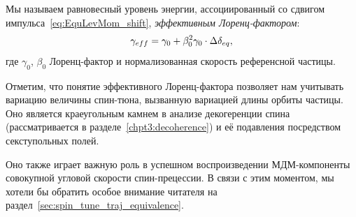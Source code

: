 Мы называем равновесный уровень энергии, ассоциированный со сдвигом импульса~\eqref{eq:EquLevMom_shift},
\emph{эффективным Лоренц-фактором}:
\begin{equation}\label{eq:EffectiveGamma}
\g*= \gamma_0 + \beta_0^2\gamma_0\cdot\Delta\delta_{eq},
\end{equation}
где $\gamma_0$, $\beta_0$ Лоренц-фактор и нормализованная скорость референсной частицы.

Отметим, что понятие эффективного Лоренц-фактора позволяет нам учитывать вариацию величины спин-тюна,
вызванную вариацией длины орбиты частицы. Оно является краеугольным камнем в анализе 
декогеренции спина (рассматривается в разделе~\ref{chpt3:decoherence}) и её подавления посредством секступольных полей.

Оно также играет важную роль в успешном воспроизведении МДМ-компоненты совокупной угловой скорости
спин-прецессии. В связи с этим моментом, мы хотели бы обратить особое внимание читателя на раздел~\ref{sec:spin_tune_traj_equivalence}.

